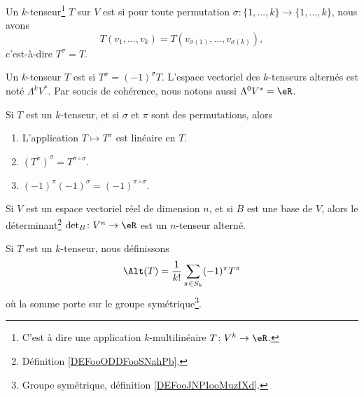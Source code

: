 \begin{definition}
	Un \( k\)-tenseur\footnote{C'est à dire une application \( k\)-multilinéaire \(T \colon V^k\to \eR  \).} \( T\) sur \( V\) est  si pour toute permutation \(\sigma \colon \{ 1,\ldots,k \}\to \{ 1,\ldots,k \}  \), nous avons
	\begin{equation}
		T(v_1,\ldots,v_k)=T(v_{\sigma(1)},\ldots,v_{\sigma(k)}),
	\end{equation}
	c'est-à-dire \( T^{\sigma}=T\).
\end{definition}

\begin{definition}
	Un \( k\)-tenseur \( T\) est  si \( T^{\sigma}=(-1)^{\sigma}T\). L'espace vectoriel des \( k\)-tenseurs alternés est noté \( \Lambda^kV^*\). Par soucis de cohérence, nous notons aussi \( \Lambda^0V^*=\eR\).
\end{definition}

\begin{lemma}		\label{LEMooJEZYooMmrtgu}
	Si \( T\) est un \( k\)-tenseur, et si \( \sigma\) et \( \pi\) sont des permutations, alors
	\begin{enumerate}
		\item
		      L'application \( T\mapsto T^{\sigma}\) est linéaire en \( T\).
		\item
		      \( (T^{\pi})^{\sigma}=T^{\pi\circ \sigma}\).
		\item
		      \( (-1)^{\pi}(-1)^{\sigma}=(-1)^{\pi\circ \sigma}\).
	\end{enumerate}
\end{lemma}


\begin{lemma}		\label{LEMooZMTPooKnqSuz}
	Si \( V\) est un espace vectoriel réel de dimension \( n\), et si \( B\) est une base de \( V\), alors le déterminant\footnote{Définition \ref{DEFooODDFooSNahPb}.} \(\det_B \colon V^n\to \eR  \) est un \( n\)-tenseur alterné.
\end{lemma}

\begin{definition}		\label{DEFooHAKAooIfbsEy}
	Si \( T\) est un \( k\)-tenseur, nous définissons
	\begin{equation}
		\Alt(T)=\frac{1}{ k!}\sum_{\pi\in S_k}(-1)^{\pi}T^{\pi}
	\end{equation}
	où la somme porte sur le groupe symétrique\footnote{Groupe symétrique, définition \ref{DEFooJNPIooMuzIXd}.}.
\end{definition}

